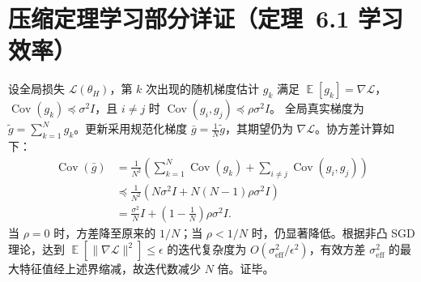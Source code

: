 \documentclass{ctexart}
\DeclareMathOperator{\Cov}{Cov}
\DeclareMathOperator{\E}{\mathbb{E}}
\begin{document}
\section{压缩定理学习部分详证（定理~6.1 学习效率）}

设全局损失 $\mathcal{L}(\theta_H)$，第 $k$ 次出现的随机梯度估计 $g_k$ 满足 $\E[g_k] = \nabla \mathcal{L}$，$\Cov(g_k) \preceq \sigma^2 I$，且 $i\neq j$ 时 $\Cov(g_i, g_j) \preceq \rho \sigma^2 I$。  
全局真实梯度为 $\tilde{g} = \sum_{k=1}^N g_k$。更新采用规范化梯度 $\bar{g} = \frac{1}{N}\tilde{g}$，其期望仍为 $\nabla \mathcal{L}$。协方差计算如下：
\[
\begin{aligned}
\Cov(\bar{g}) &= \frac{1}{N^2} \left( \sum_{k=1}^N \Cov(g_k) + \sum_{i\neq j} \Cov(g_i, g_j) \right)\\
&\preceq \frac{1}{N^2} \left( N \sigma^2 I + N(N-1) \rho \sigma^2 I \right)\\
&= \frac{\sigma^2}{N} I + \left(1-\frac1N\right) \rho \sigma^2 I.
\end{aligned}
\]
当 $\rho = 0$ 时，方差降至原来的 $1/N$；当 $\rho < 1/N$ 时，仍显著降低。根据非凸 SGD 理论，达到 $\E[\|\nabla\mathcal{L}\|^2]\le \epsilon$ 的迭代复杂度为 $O(\sigma^2_{\text{eff}}/\epsilon^2)$，有效方差 $\sigma^2_{\text{eff}}$ 的最大特征值经上述界缩减，故迭代数减少 $N$ 倍。证毕。
\end{document}
